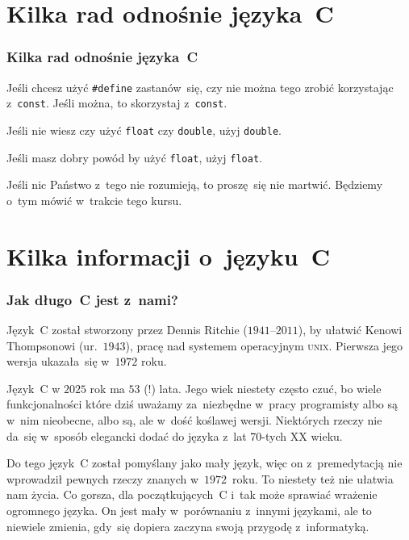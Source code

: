 \documentclass[10pt,t]{beamer}
\begin{document}
\section{Kilka rad odnośnie języka~C}


\begin{frame}
  \frametitle{Kilka rad odnośnie języka~C}


  Jeśli chcesz użyć \texttt{\#define} zastanów~się, czy nie można
  tego zrobić korzystając z~\texttt{const}. Jeśli można, to skorzystaj
  z~\texttt{const}.

  Jeśli nie wiesz czy użyć \texttt{float} czy \texttt{double}, użyj
  \texttt{double}.

  Jeśli masz dobry powód by użyć \texttt{float}, użyj \texttt{float}.

  Jeśli nic Państwo z~tego nie rozumieją, to proszę~się nie martwić.
  Będziemy o~tym mówić w~trakcie tego kursu.

\end{frame}










\section{Kilka informacji o~języku~C}



\begin{frame}
  \frametitle{Jak długo~C jest z~nami?}


  Język~C został stworzony przez Dennis Ritchie ($1941\text{--}2011$), by
  ułatwić Kenowi Thompsonowi (ur.~$1943$), pracę nad systemem operacyjnym
  \textsc{unix}. Pierwsza jego wersja ukazała~się w~$1972$ roku.

  Język~C w $2025$ rok ma $53$ (!) lata. Jego wiek
  niestety często czuć, bo wiele funkcjonalności które dziś uważamy
  za~niezbędne w~pracy programisty albo są w~nim nieobecne, albo są,
  ale w~dość koślawej wersji. Niektórych rzeczy nie da~się w~sposób
  elegancki dodać do języka z~lat 70-tych XX wieku.

  Do tego język~C został pomyślany jako mały język, więc on z~premedytacją
  \alert{nie} wprowadził pewnych rzeczy znanych w~$1972$~roku. To
  niestety też nie ułatwia nam życia. Co gorsza, dla początkujących~C i~tak
  może sprawiać wrażenie ogromnego języka. On jest mały w~porównaniu
  z~innymi językami, ale to niewiele zmienia, gdy~się dopiera zaczyna swoją
  przygodę z~informatyką.

\end{frame}
\end{document}
